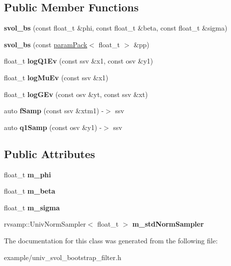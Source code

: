 \subsection*{Public Member Functions}
\begin{DoxyCompactItemize}
\item 
\mbox{\label{classsvol__bs_a36902082260b8fb13251722ac8b527a8}} 
{\bfseries svol\+\_\+bs} (const float\+\_\+t \&phi, const float\+\_\+t \&beta, const float\+\_\+t \&sigma)
\item 
\mbox{\label{classsvol__bs_ae881f2825f480976227f46922c47679f}} 
{\bfseries svol\+\_\+bs} (const \hyperlink{classparamPack}{param\+Pack}$<$ float\+\_\+t $>$ \&pp)
\item 
\mbox{\label{classsvol__bs_a4461faab02ba3fa09ee9e4977841b297}} 
float\+\_\+t {\bfseries log\+Q1\+Ev} (const ssv \&x1, const osv \&y1)
\item 
\mbox{\label{classsvol__bs_a067870660bf0d60b032411df7fe32546}} 
float\+\_\+t {\bfseries log\+Mu\+Ev} (const ssv \&x1)
\item 
\mbox{\label{classsvol__bs_a460a24a129edaf68650aeec9d28fedf8}} 
float\+\_\+t {\bfseries log\+G\+Ev} (const osv \&yt, const ssv \&xt)
\item 
\mbox{\label{classsvol__bs_a59120c1870072f1d63a3057d9ba614cf}} 
auto {\bfseries f\+Samp} (const ssv \&xtm1) -\/$>$ ssv
\item 
\mbox{\label{classsvol__bs_ab12997187805f7d9b21f5041daaf70b7}} 
auto {\bfseries q1\+Samp} (const osv \&y1) -\/$>$ ssv
\end{DoxyCompactItemize}
\subsection*{Public Attributes}
\begin{DoxyCompactItemize}
\item 
\mbox{\label{classsvol__bs_ab46db50cdce58fd3b9d72566dfc12715}} 
float\+\_\+t {\bfseries m\+\_\+phi}
\item 
\mbox{\label{classsvol__bs_ae197d739aedd1c2df113f2de6131495c}} 
float\+\_\+t {\bfseries m\+\_\+beta}
\item 
\mbox{\label{classsvol__bs_aa312d7aa75de3c1d42c023a2ff8d63b5}} 
float\+\_\+t {\bfseries m\+\_\+sigma}
\item 
\mbox{\label{classsvol__bs_a324a11de663832348bf3ce3435a1b0df}} 
rvsamp\+::\+Univ\+Norm\+Sampler$<$ float\+\_\+t $>$ {\bfseries m\+\_\+std\+Norm\+Sampler}
\end{DoxyCompactItemize}


The documentation for this class was generated from the following file\+:\begin{DoxyCompactItemize}
\item 
example/univ\+\_\+svol\+\_\+bootstrap\+\_\+filter.\+h\end{DoxyCompactItemize}
